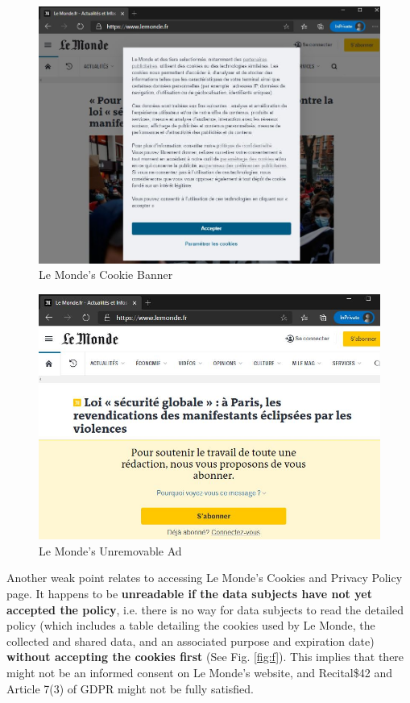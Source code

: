 \documentclass[twocolumn, letterpaper]{scrartcl}
\begin{document}
    	\begin{figure}[tbp]
            \includegraphics[width=0.9\linewidth]{lm_website.JPG}
            \caption{Le Monde's Cookie Banner \label{fig:d}}
        \end{figure}
        
        \begin{figure}[tbp]
            \includegraphics[width=0.95\linewidth]{lm_sub.JPG}
            \caption{Le Monde's Unremovable Ad \label{fig:e}}
        \end{figure}
        
    	Another weak point relates to accessing Le Monde's Cookies and Privacy Policy page\cite{LM2}. It happens to be \textbf{unreadable if the data subjects have not yet accepted the policy}, i.e. there is no way for data subjects to read the detailed policy (which includes a table detailing the cookies used by Le Monde, the collected and shared data, and an associated purpose and expiration date) \textbf{without accepting the cookies first} (See Fig. \ref{fig:f}). This implies that there might not be an informed consent on Le Monde's website, and Recital\$42 and Article 7(3) of GDPR might not be fully satisfied. 
        
\end{document}
